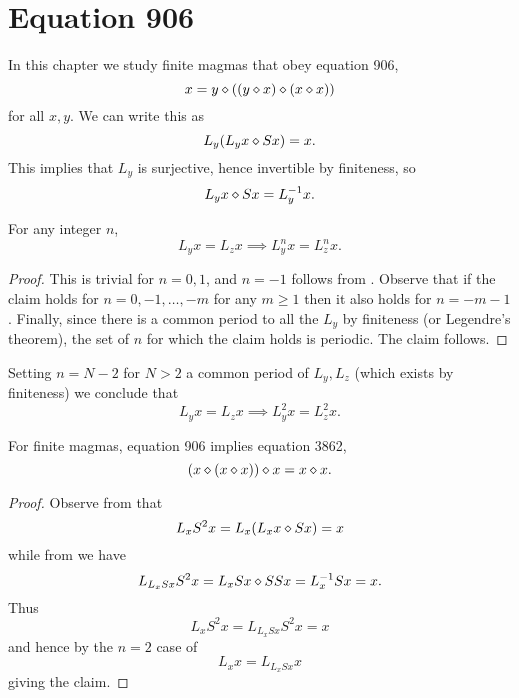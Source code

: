 \chapter{Equation 906}\label{906-chapter}

In this chapter we study finite magmas that obey equation 906,
\begin{equation}\label{906}
  x = y \diamond ((y \diamond x) \diamond (x \diamond x))
\end{equation}
for all $x,y$.  We can write this as
\begin{equation}\label{906-a}
  L_y (L_y x \diamond Sx) = x.
\end{equation}
This implies that $L_y$ is surjective, hence invertible by finiteness, so
\begin{equation}\label{906-b}
   L_y x \diamond Sx = L_y^{-1} x.
\end{equation}

\begin{corollary}\label{edge-disjoint}  For any integer $n$,
$$ L_y x = L_z x \implies L_y^{n} x = L_z^{n} x.$$
\end{corollary}

\begin{proof}  This is trivial for $n=0,1$, and $n=-1$ follows from .  Observe that if the claim holds for $n=0,-1,\dots,-m$ for any $m \geq 1$ then it also holds for $n=-m-1$.  Finally, since there is a common period to all the $L_y$ by finiteness (or Legendre's theorem), the set of $n$ for which the claim holds is periodic.  The claim follows.
\end{proof}
Setting $n = N-2$ for $N>2$ a common period of $L_y,L_z$ (which exists by finiteness) we conclude that
\begin{equation}\label{lyzx}
  L_y x = L_z x \implies L_y^2 x = L_z^2 x.
\end{equation}

\begin{theorem}\label{906-3862} For finite magmas, equation 906 implies
equation 3862,
\begin{equation}\label{3862}
    (x \diamond (x \diamond x)) \diamond x = x \diamond x.
\end{equation}
\end{theorem}

\begin{proof} Observe from  that
$$ L_x S^2 x = L_x (L_x x \diamond Sx) = x$$
while from  we have
$$ L_{L_x Sx} S^2 x = L_x Sx \diamond S S x = L_x^{-1} Sx = x.$$
Thus
$$ L_x S^2 x = L_{L_x Sx} S^2 x = x$$
and hence by the $n=2$ case of 
$$ L_x x = L_{L_x Sx} x$$
giving the claim.
\end{proof}
